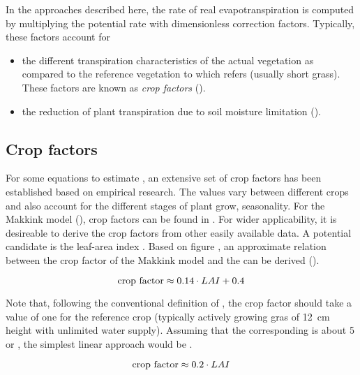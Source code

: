 In the approaches described here, the rate of real evapotranspiration \etReal{} is computed by multiplying the potential rate \etPot{} with dimensionless correction factors. Typically, these factors account for
\begin{itemize}
  \item the different transpiration characteristics of the actual vegetation as compared to the reference vegetation to which \etPot{} refers (usually short grass). These factors are known as \emph{crop factors} ().
  \item the reduction of plant transpiration due to soil moisture limitation ().
\end{itemize}

\subsection{Crop factors} \label{sec:et:real:cropfactors}

For some equations to estimate \etPot{}, an extensive set of crop factors has been established based on empirical research. The values vary between different crops and also account for the different stages of plant grow, \ie{} seasonality. For the Makkink model (), crop factors can be found in \citet{Feddes1987}. For wider applicability, it is desireable to derive the crop factors from other easily available data. A potential candidate is the leaf-area index \leafAreaIndex. Based on figure , an approximate relation between the crop factor of the Makkink model and the \leafAreaIndex{} can be derived ().

\begin{equation} \label{eqn:et:real:cropfactor-LAI}
  \text{crop factor} \approx 0.14 \cdot LAI + 0.4 
\end{equation}

Note that, following the conventional definition of \etPot{}, the crop factor should take a value of one for the reference crop (typically actively growing gras of 12~cm height with unlimited water supply). Assuming that the corresponding \leafAreaIndex{} is about 5 \citep[see, \eg][]{Misra1981} or \citep[][page 11]{Bremicker2006}, the simplest linear approach would be .

\begin{equation} \label{eqn:et:real:cropfactor-LAI-simple}
  \text{crop factor} \approx 0.2 \cdot LAI
\end{equation}

